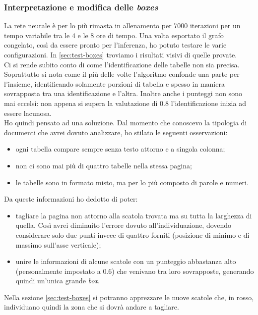         \subsubsection{Interpretazione e modifica delle \textit{boxes}}
        \label{sec:interpretazione-modifica-boxes}
        La rete neurale è per lo più rimasta in allenamento per 7000 iterazioni per un tempo variabile tra le 4 e le 8 ore di tempo. Una volta esportato il grafo congelato, così da essere pronto per l'inferenza, ho potuto testare le varie configurazioni. In \ref{sec:test-boxes} troviamo i risultati visivi di quelle provate.
        \medskip
        \\Ci si rende subito conto di come l'identificazione delle tabelle non sia precisa. Soprattutto si nota come il più delle volte l'algoritmo confonde una parte per l'insieme, identificando solamente porzioni di tabella e spesso in maniera sovrapposta tra una identificazione e l'altra. Inoltre anche i punteggi non sono mai eccelsi: non appena si supera la valutazione di $0.8$ l'identificazione inizia ad essere lacunosa. 
        \medskip
        \\Ho quindi pensato ad una soluzione. Dal momento che conoscevo la tipologia di documenti che avrei dovuto analizzare, ho stilato le seguenti osservazioni:
        \begin{itemize}
            \item ogni tabella compare sempre senza testo attorno e a singola colonna;
            \item non ci sono mai più di quattro tabelle nella stessa pagina;
            \item le tabelle sono in formato misto, ma per lo più composto di parole e numeri.
        \end{itemize}
        Da queste informazioni ho dedotto di poter:
        \begin{itemize}
            \item tagliare la pagina non attorno alla scatola trovata ma su tutta la larghezza di quella. Così avrei diminuito l'errore dovuto all'individuazione, dovendo considerare solo due punti invece di quattro forniti (posizione di minimo e di massimo sull'asse verticale);
            \item unire le informazioni di alcune scatole con un punteggio abbastanza alto (personalmente impostato a $0.6$) che venivano tra loro sovrapposte, generando quindi un'unica grande \textit{box}.
        \end{itemize}
        Nella sezione \ref{sec:test-boxes} si potranno apprezzare le nuove scatole che, in rosso, individuano quindi la zona che si dovrà andare a tagliare.
    

